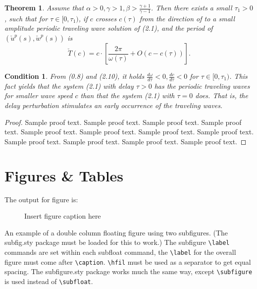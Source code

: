 \documentclass[preprint,pteplogo]{ptephy_v2}%
\newtheorem{theorem}{Theorem}
\newtheorem{condition}{Condition}
\begin{document}

\begin{theorem}\label{T0.1}
Assume that $\alpha>0, \gamma>1, \beta>\frac{\gamma+1}{\gamma-1}$.
Then there exists a small $\tau_1>0$, such that for $\tau\in
[0,\tau_1)$, if $c$ crosses $c(\tau)$ from the direction of
to  a small amplitude periodic traveling wave solution of
(2.1), and the period of $(\check{u}^p(s),\check{w}^p(s))$ is
\[
\check{T}(c)=c\cdot \left[\frac{2\pi}{\omega(\tau)}+O(c-c(\tau))\right].
\]
\end{theorem}


\begin{condition}\label{C2.2}
From (0.8) and (2.10), it holds
$\frac{d\omega}{d\tau}<0,\frac{dc}{d\tau}<0$ for $\tau\in
[0,\tau_1)$. This fact yields that the system (2.1) with delay
$\tau>0$ has the periodic traveling waves for smaller wave speed $c$
than that the system (2.1) with $\tau=0$ does. That is, the
delay perturbation stimulates an early occurrence of the traveling waves.
\end{condition}

\begin{proof}
Sample proof text. Sample proof text. Sample proof text. Sample proof text.
Sample proof text. Sample proof text. Sample proof text. Sample proof text.
Sample proof text. Sample proof text. Sample proof text. Sample proof text.
\end{proof}

\section{Figures \& Tables}

The output for figure is:

\begin{figure}[!h]
\caption{Insert figure caption here}
\label{fig_sim}
\end{figure}

 An example of a double column floating figure using two subfigures.
 (The subfig.sty package must be loaded for this to work.)
 The subfigure \verb+\label+ commands are set within each subfloat command, the
 \verb+\label+ for the overall figure must come after \verb+\caption+.
 \verb+\hfil+ must be used as a separator to get equal spacing.
 The subfigure.sty package works much the same way, except \verb+\subfigure+ is
 used instead of \verb+\subfloat+.
\end{document}
